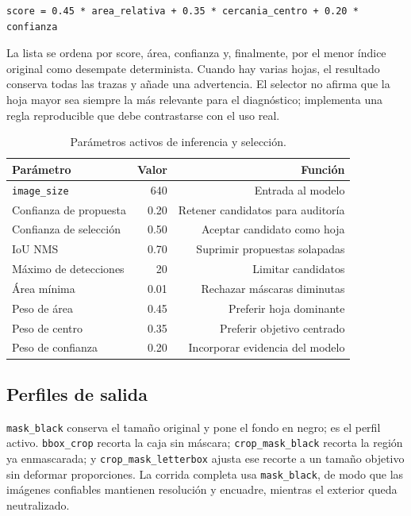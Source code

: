 \documentclass[11pt,a4paper]{article}
\begin{document}
\begin{verbatim}
score = 0.45 * area_relativa + 0.35 * cercania_centro + 0.20 * confianza
\end{verbatim}

La lista se ordena por score, área, confianza y, finalmente, por el menor índice original como desempate determinista. Cuando hay varias hojas, el resultado conserva todas las trazas y añade una advertencia. El selector no afirma que la hoja mayor sea siempre la más relevante para el diagnóstico; implementa una regla reproducible que debe contrastarse con el uso real.


\begin{table}[H]
\centering
\caption{Parámetros activos de inferencia y selección.}
\small
\begin{tabular}{lrr}
\toprule
Parámetro & Valor & Función \\
\midrule
\texttt{image\_size} & 640 & Entrada al modelo \\
Confianza de propuesta & 0.20 & Retener candidatos para auditoría \\
Confianza de selección & 0.50 & Aceptar candidato como hoja \\
IoU NMS & 0.70 & Suprimir propuestas solapadas \\
Máximo de detecciones & 20 & Limitar candidatos \\
Área mínima & 0.01 & Rechazar máscaras diminutas \\
Peso de área & 0.45 & Preferir hoja dominante \\
Peso de centro & 0.35 & Preferir objetivo centrado \\
Peso de confianza & 0.20 & Incorporar evidencia del modelo \\
\bottomrule
\end{tabular}
\end{table}

\subsection{Perfiles de salida}

\texttt{mask\_black} conserva el tamaño original y pone el fondo en negro; es el perfil activo. \texttt{bbox\_crop} recorta la caja sin máscara; \texttt{crop\_mask\_black} recorta la región ya enmascarada; y \texttt{crop\_mask\_letterbox} ajusta ese recorte a un tamaño objetivo sin deformar proporciones. La corrida completa usa \texttt{mask\_black}, de modo que las imágenes confiables mantienen resolución y encuadre, mientras el exterior queda neutralizado.
\end{document}
